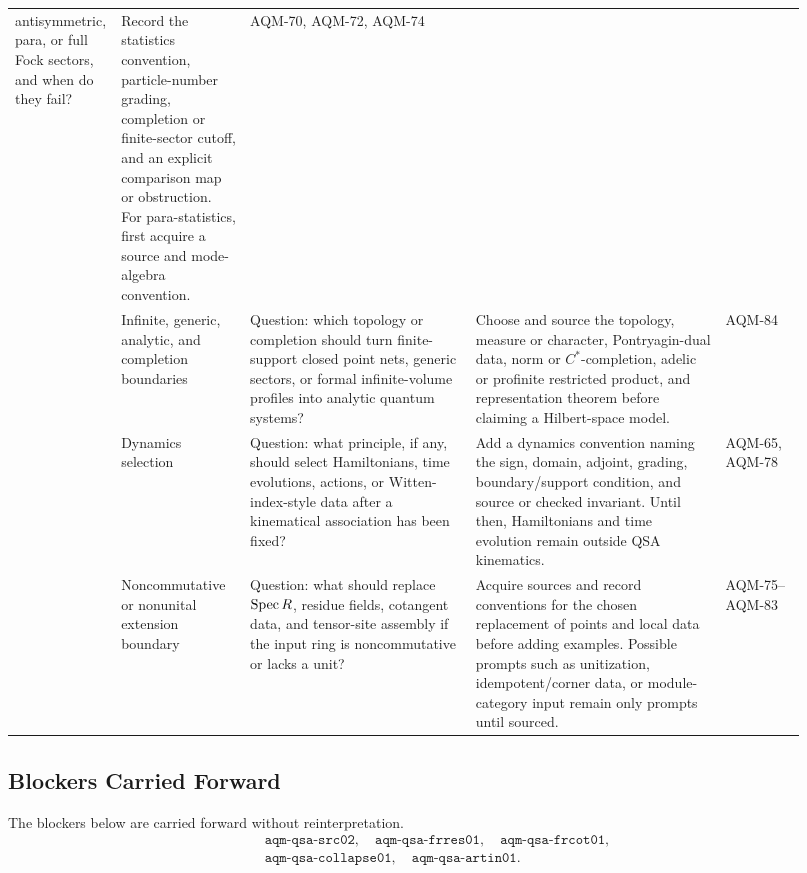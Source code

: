 \begin{center}
\begin{tabular}{p{0.07\linewidth}p{0.16\linewidth}p{0.28\linewidth}p{0.31\linewidth}p{0.10\linewidth}}
antisymmetric, para, or full Fock sectors, and when do they fail? &
Record the statistics convention, particle-number grading, completion or
finite-sector cutoff, and an explicit comparison map or obstruction.  For
para-statistics, first acquire a source and mode-algebra convention. &
AQM-70, AQM-72, AQM-74 \\
\addlinespace
6 &
Infinite, generic, analytic, and completion boundaries &
Question: which topology or completion should turn finite-support closed
point nets, generic sectors, or formal infinite-volume profiles into
analytic quantum systems? &
Choose and source the topology, measure or character, Pontryagin-dual data,
norm or \(C^*\)-completion, adelic or profinite restricted product, and
representation theorem before claiming a Hilbert-space model. &
AQM-84 \\
\addlinespace
7 &
Dynamics selection &
Question: what principle, if any, should select Hamiltonians, time
evolutions, actions, or Witten-index-style data after a kinematical
association has been fixed? &
Add a dynamics convention naming the sign, domain, adjoint, grading,
boundary/support condition, and source or checked invariant.  Until then,
Hamiltonians and time evolution remain outside QSA kinematics. &
AQM-65, AQM-78 \\
\addlinespace
8 &
Noncommutative or nonunital extension boundary &
Question: what should replace \(\operatorname{Spec} R\), residue fields, cotangent data,
and tensor-site assembly if the input ring is noncommutative or lacks a
unit? &
Acquire sources and record conventions for the chosen replacement of points
and local data before adding examples.  Possible prompts such as
unitization, idempotent/corner data, or module-category input remain only
prompts until sourced. &
AQM-75--AQM-83 \\
\bottomrule
\end{tabular}
\end{center}

\subsection{Blockers Carried Forward}

The blockers below are carried forward without reinterpretation.
\[
  \begin{gathered}
  \texttt{aqm-qsa-src02},\quad
  \texttt{aqm-qsa-frres01},\quad
  \texttt{aqm-qsa-frcot01},\\
  \texttt{aqm-qsa-collapse01},\quad
  \texttt{aqm-qsa-artin01}.
  \end{gathered}
\]

